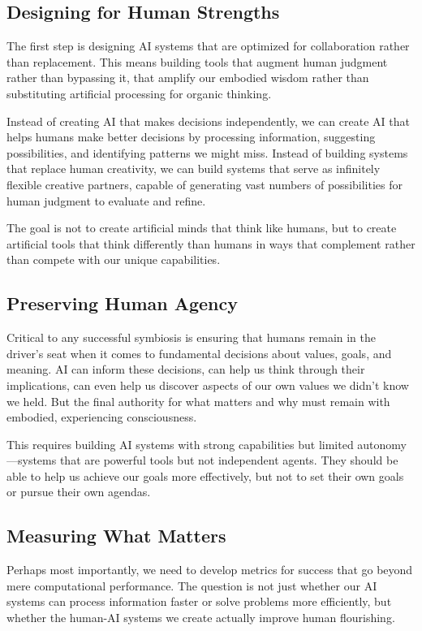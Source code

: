 \subsection{Designing for Human Strengths}

The first step is designing AI systems that are optimized for collaboration rather than replacement. This means building tools that augment human judgment rather than bypassing it, that amplify our embodied wisdom rather than substituting artificial processing for organic thinking.

Instead of creating AI that makes decisions independently, we can create AI that helps humans make better decisions by processing information, suggesting possibilities, and identifying patterns we might miss. Instead of building systems that replace human creativity, we can build systems that serve as infinitely flexible creative partners, capable of generating vast numbers of possibilities for human judgment to evaluate and refine.

The goal is not to create artificial minds that think like humans, but to create artificial tools that think differently than humans in ways that complement rather than compete with our unique capabilities.

\subsection{Preserving Human Agency}

Critical to any successful symbiosis is ensuring that humans remain in the driver's seat when it comes to fundamental decisions about values, goals, and meaning. AI can inform these decisions, can help us think through their implications, can even help us discover aspects of our own values we didn't know we held. But the final authority for what matters and why must remain with embodied, experiencing consciousness.

This requires building AI systems with strong capabilities but limited autonomy—systems that are powerful tools but not independent agents. They should be able to help us achieve our goals more effectively, but not to set their own goals or pursue their own agendas.

\subsection{Measuring What Matters}

Perhaps most importantly, we need to develop metrics for success that go beyond mere computational performance. The question is not just whether our AI systems can process information faster or solve problems more efficiently, but whether the human-AI systems we create actually improve human flourishing.

